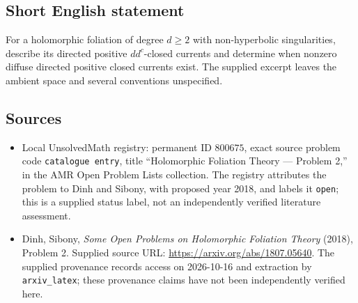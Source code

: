 \documentclass[11pt]{article}
\begin{document}
\subsection{Short English statement}
For a holomorphic foliation of degree \(d\geq 2\) with non-hyperbolic singularities, describe its directed positive \(dd^c\)-closed currents and determine when nonzero diffuse directed positive closed currents exist. The supplied excerpt leaves the ambient space and several conventions unspecified.
\subsection{Sources}
\begin{itemize}
\item Local UnsolvedMath registry: permanent ID \(800675\), exact source problem code \texttt{catalogue entry}, title ``Holomorphic Foliation Theory --- Problem 2,'' in the AMR Open Problem Lists collection. The registry attributes the problem to Dinh and Sibony, with proposed year 2018, and labels it \texttt{open}; this is a supplied status label, not an independently verified literature assessment.
\item Dinh, Sibony, \emph{Some Open Problems on Holomorphic Foliation Theory} (2018), Problem 2. Supplied source URL: \url{https://arxiv.org/abs/1807.05640}. The supplied provenance records access on 2026-10-16 and extraction by \texttt{arxiv\_latex}; these provenance claims have not been independently verified here.
\end{itemize}
\end{document}
